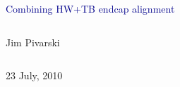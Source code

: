 \documentclass[compress]{beamer}
\begin{document}
\begin{frame}
\vfill
\begin{center}
\textcolor{darkblue}{\Large Combining HW+TB endcap alignment}

\vfill
\begin{columns}
\begin{center}
\large
Jim Pivarski
\end{center}
\end{columns}

\vfill
23 July, 2010

\end{center}
\end{frame}


\small
\end{document}
